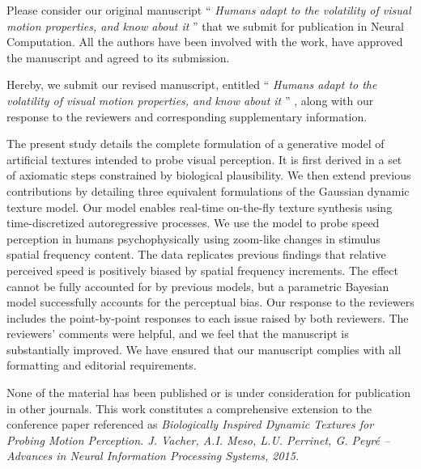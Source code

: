 \documentclass[stdletter,8pt,dateno]{newlfm}%
\newcommand{\Title}{
Humans adapt to the volatility of visual motion properties, and know about it
}
\newcommand{\Journal}{Neural Computation}%
\begin{document}

Please consider our original manuscript ``{\it \Title }'' that we submit for publication in \Journal . All the authors have been involved with the work, have approved the manuscript and agreed to its submission.

Hereby, we submit our revised manuscript, entitled ``{\it \Title }'' ,  along  with  our  response  to  the  reviewers  and  corresponding  supplementary  information.  


The present study details the complete formulation of a generative
model of artificial textures intended to probe visual perception. It is first derived in a set of
axiomatic steps constrained by biological plausibility. We then extend previous contributions
by detailing three equivalent formulations of the Gaussian dynamic texture
model. Our model enables real-time on-the-fly texture synthesis using time-discretized autoregressive
processes. We use the model to probe speed perception in humans psychophysically using zoom-like changes
in stimulus spatial frequency content. The data replicates previous findings that relative perceived speed is positively biased by spatial
frequency increments. The effect cannot be fully accounted for by previous models,
but a parametric Bayesian model successfully accounts for the perceptual bias.
%
Our  response  to  the  reviewers  includes  the  point-by-point  responses  to  each  issue  raised  by  
both reviewers. The reviewers’ comments were helpful, and we feel that the manuscript is substantially improved.  
We have ensured that our manuscript complies with all formatting and editorial requirements.  


None of the material has been published or is under consideration for
publication in other journals. This work constitutes a comprehensive extension to the conference paper referenced as \textit{Biologically Inspired Dynamic Textures for Probing Motion Perception.
J. Vacher, A.I. Meso, L.U. Perrinet, G. Peyr\'e -- Advances in Neural Information Processing Systems, 2015.}
\end{document}
